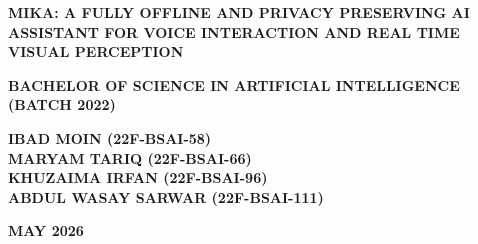 \documentclass[12pt,a4paper]{report}
\begin{document}


\begin{titlepage}
\thispagestyle{logoheader_empty}

\begin{center}
  

    {\fontsize{16}{22}\selectfont \textbf{MIKA: A FULLY OFFLINE AND PRIVACY PRESERVING AI ASSISTANT FOR VOICE INTERACTION AND REAL TIME VISUAL PERCEPTION}} \\
    
    \vspace{1.5cm}
    
    {\fontsize{16}{20}\selectfont \textbf{BACHELOR OF SCIENCE IN ARTIFICIAL INTELLIGENCE \\ (BATCH 2022)}} \\
    
    \vspace{1.5cm}
    
    {\fontsize{16}{20}\selectfont \textbf{
        IBAD MOIN (22F-BSAI-58) \\ 
        \vspace{0.1cm}
        MARYAM TARIQ (22F-BSAI-66) \\ 
        \vspace{0.1cm}
        KHUZAIMA IRFAN (22F-BSAI-96) \\ 
        \vspace{0.2cm}
        ABDUL WASAY SARWAR (22F-BSAI-111)
    }}

    \vfill %

    \vspace{1cm}

    {\fontsize{14}{17}\selectfont \textbf{MAY 2026}}

\end{center}
\end{titlepage}
\end{document}
